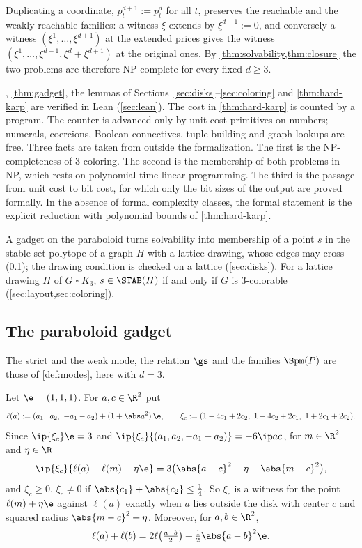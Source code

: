 Duplicating a coordinate, $p^{d+1}_t:=p^d_t$ for all $t$, preserves the reachable and the weakly reachable families: a witness $\xi$ extends by $\xi^{d+1}:=0$, and conversely a witness $(\xi^1,\dots,\xi^{d+1})$ at the extended prices gives the witness $(\xi^1,\dots,\xi^{d-1},\xi^d+\xi^{d+1})$ at the original ones. By \cref{thm:solvability,thm:closure} the two problems are therefore NP-complete for every fixed $d\ge3$.

\begin{remark}\label{rem:hard-scope}
, \cref{thm:gadget}, the lemmas of Sections~\ref{sec:disks}--\ref{sec:coloring} and \cref{thm:hard-karp} are verified in Lean (\cref{sec:lean}). The cost in \cref{thm:hard-karp} is counted by a program. The counter is advanced only by unit-cost primitives on numbers; numerals, coercions, Boolean connectives, tuple building and graph lookups are free. Three facts are taken from outside the formalization. The first is the NP-completeness of 3-coloring. The second is the membership of both problems in NP, which rests on polynomial-time linear programming. The third is the passage from unit cost to bit cost, for which only the bit sizes of the output are proved formally. In the absence of formal complexity classes, the formal statement is the explicit reduction with polynomial bounds of \cref{thm:hard-karp}.
\end{remark}

A gadget on the paraboloid turns solvability into membership of a point $s$ in the stable set polytope of a graph $H$ with a lattice drawing, whose edges may cross (\cref{sec:gadget}); the drawing condition is checked on a lattice (\cref{sec:disks}). For a lattice drawing $H$ of $G\mathbin{\square}K_3$, $s\in\STAB(H)$ if and only if $G$ is 3-colorable (\cref{sec:layout,sec:coloring}).

\subsection{The paraboloid gadget}\label{sec:gadget}

The strict and the weak mode, the relation $\gs$ and the families $\Spm(P)$ are those of \cref{def:modes}, here with $d=3$.

Let $\e=(1,1,1)$. For $a,c\in\R^2$ put
\[
\ell(a):=(a_1,\ a_2,\ -a_1-a_2)+(1+\abs a^2)\,\e,\qquad
\xi_c:=(1-4c_1+2c_2,\ 1-4c_2+2c_1,\ 1+2c_1+2c_2).
\]
Since $\ip{\xi_c}\e=3$ and $\ip{\xi_c}{(a_1,a_2,-a_1-a_2)}=-6\ip ac$, for $m\in\R^2$ and $\eta\in\R$
\begin{equation}\label{eq:hard-wit}
\ip{\xi_c}{\ell(a)-\ell(m)-\eta\e}=3\bigl(\abs{a-c}^2-\eta-\abs{m-c}^2\bigr),
\end{equation}
and $\xi_c\ge0$, $\xi_c\ne0$ if $\abs{c_1}+\abs{c_2}\le\frac14$. So $\xi_c$ is a witness for the point $\ell(m)+\eta\e$ against $\ell(a)$ exactly when $a$ lies outside the disk with center $c$ and squared radius $\abs{m-c}^2+\eta$. Moreover, for $a,b\in\R^2$,
\begin{equation}\label{eq:hard-chord}
\ell(a)+\ell(b)=2\ell\bigl(\tfrac{a+b}2\bigr)+\tfrac12\abs{a-b}^2\e.
\end{equation}

